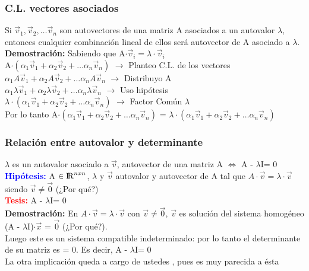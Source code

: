 \documentclass{article}
\begin{document}
\subsubsection{C.L. vectores asociados}
Si $\vec{v}_1, \vec{v}_2, \ldots \vec{v}_n$ son autovectores de una matriz A asociados a un autovalor $\lambda$, entonces cualquier combinación lineal de ellos será autovector de A asociado a $\lambda$. \\
\textbf{Demostración:} Sabiendo que A$\cdot\vec{v}_i = \lambda\cdot\vec{v}_i$\\ 
A$\cdot( \alpha_1\vec{v}_1 + \alpha_2\vec{v}_2 + \ldots \alpha_n\vec{v}_n )$ $\rightarrow$ Planteo C.L. de los vectores\\ 
$ \alpha_1A\vec{v}_1 + \alpha_2A\vec{v}_2 + \ldots \alpha_nA\vec{v}_n$ $\rightarrow$ Distribuyo A\\
$ \alpha_1\lambda\vec{v}_1 + \alpha_2\lambda\vec{v}_2 + \ldots \alpha_n\lambda\vec{v}_n$  $\rightarrow$ Uso hipótesis\\
$\lambda \cdot(\alpha_1\vec{v}_1 + \alpha_2\vec{v}_2 + \ldots \alpha_n\vec{v}_n)$ $\rightarrow$ Factor Común $\lambda$\\
Por lo tanto A$\cdot( \alpha_1\vec{v}_1 + \alpha_2\vec{v}_2 + \ldots \alpha_n\vec{v}_n )$ = $\lambda \cdot(\alpha_1\vec{v}_1 + \alpha_2\vec{v}_2 + \ldots \alpha_n\vec{v}_n)$
\subsubsection{Relación entre autovalor y determinante}
$\lambda$ es un autovalor asociado a $\vec{v}$, autovector de una matriz A $\Leftrightarrow$ \textbar  A - $\lambda$I\textbar = 0\\
{\bfseries \textcolor{blue}{Hipótesis:}} A $\in {\rm I\!R}^{nxn}$, $\lambda$ y $\vec{v}$ autovalor y autovector de A tal que $A\cdot\vec{v} = \lambda\cdot\vec{v}$ siendo $\vec{v} \neq \vec{0}$ (¿Por qué?)\\
{\bfseries \textcolor{red}{Tesis:}} \textbar  A - $\lambda$I\textbar = 0\\
\textbf{Demostración:} En $A\cdot\vec{v} = \lambda\cdot\vec{v}$ con  $\vec{v} \neq \vec{0}$, $\vec{v}$ es solución del sistema homogéneo (A - $\lambda$I)$\cdot\vec{x}$ = $\vec{0}$ (¿Por qué?).\\
Luego este es un sistema compatible indeterminado: por lo tanto el determinante de su matriz es = 0. Es decir, \textbar  A - $\lambda$I\textbar = 0\\
La otra implicación queda a cargo de ustedes ,
pues es muy parecida a ésta
\end{document}
